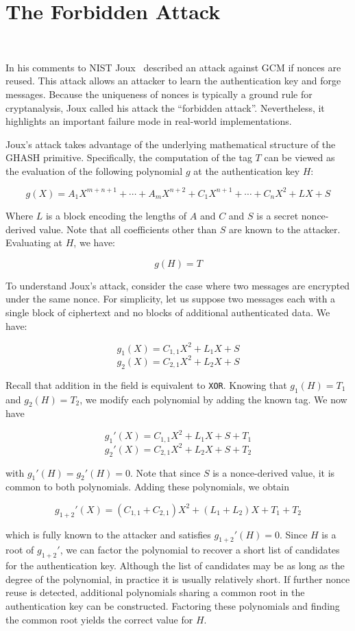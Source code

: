 \documentclass[10pt, a4paper]{article}
\begin{document}
\section{The Forbidden Attack}~\label{sec:forbidden}

In his comments to NIST Joux~\cite{joux2007} described an attack against GCM if nonces are reused. This attack allows an attacker to learn the authentication key and forge messages. Because the uniqueness of nonces is typically a ground rule for cryptanalysis, Joux called his attack the ``forbidden attack''. Nevertheless, it highlights an important
failure mode in real-world implementations.

Joux's attack takes advantage of the underlying mathematical structure of the GHASH primitive. Specifically, the computation of the tag $T$ can be viewed as the evaluation of the following polynomial $g$ at the authentication key $H$:

\[
g(X) = A_{1}X^{m+n+1} + \cdots + A_{m}X^{n+2} + C_{1}X^{n+1} + \cdots + C_{n}X^2 + LX + S
\]

Where $L$ is a block encoding the lengths of $A$ and $C$ and $S$ is a secret nonce-derived value. Note that all coefficients other than $S$ are known to the attacker.  Evaluating at $H$, we have:

\[
g(H) = T
\]

To understand Joux's attack, consider the case where two messages are encrypted under the same nonce. For simplicity, let us suppose two messages each with a single block of ciphertext and no blocks of additional authenticated data. We have:

\[
g_{1}(X) = C_{1,1}X^2 + L_{1}X + S
\]
\[
g_{2}(X) = C_{2,1}X^2 + L_{2}X + S
\]

Recall that addition in the field is equivalent to \texttt{XOR}. Knowing that $g_{1}(H) = T_{1}$ and $g_{2}(H) = T_{2}$, we modify each polynomial by adding the known tag. We now have

\[
g_{1}'(X) = C_{1,1}X^2 + L_{1}X + S + T_{1}
\]
\[
g_{2}'(X) = C_{2,1}X^2 + L_{2}X + S + T_{2}
\]

with $g_{1}'(H) = g_{2}'(H) = 0$. Note that since $S$ is a nonce-derived value, it is common to both polynomials. Adding these polynomials, we obtain

\[
g_{1+2}'(X) = (C_{1,1} + C_{2,1})X^2 + (L_{1} + L_{2})X + T_{1} + T_{2}
\]

which is fully known to the attacker and satisfies $g_{1+2}'(H) = 0$. Since $H$ is a root of $g_{1+2}'$, we can factor the polynomial to recover a short list of candidates for the authentication key. Although the list of candidates may be as long as the degree of the polynomial, in practice it is usually relatively short. 
If further nonce reuse is detected, additional polynomials sharing a common root in the authentication key can be constructed. Factoring these polynomials and finding the common root yields the correct value for $H$.
\end{document}
